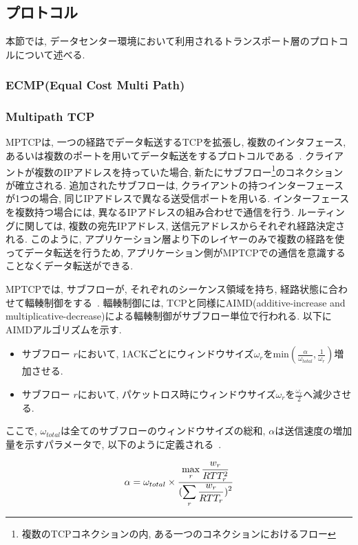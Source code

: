 \documentclass[11pt, a4paper, uplatex]{jsarticle}
\begin{document}
\subsection{プロトコル}
本節では, データセンター環境において利用されるトランスポート層のプロトコルについて述べる. 

\subsubsection{ECMP(Equal Cost Multi Path)}

\subsubsection{Multipath TCP}
MPTCPは, 一つの経路でデータ転送するTCPを拡張し, 複数のインタフェース,
あるいは複数のポートを用いてデータ転送をするプロトコルである~\cite{mptcp}.
クライアントが複数のIPアドレスを持っていた場合, 新たにサブフロー\footnote{複数のTCPコネクションの内,
ある一つのコネクションにおけるフロー}のコネクションが確立される.
追加されたサブフローは, クライアントの持つインターフェースが1つの場合, 同じIPアドレスで異なる送受信ポートを用いる.
インターフェースを複数持つ場合には, 異なるIPアドレスの組み合わせで通信を行う.
ルーティングに関しては, 複数の宛先IPアドレス, 送信元アドレスからそれぞれ経路決定される.
このように, アプリケーション層より下のレイヤーのみで複数の経路を使ってデータ転送を行うため,
アプリケーション側がMPTCPでの通信を意識することなくデータ転送ができる.

MPTCPでは, サブフローが, それぞれのシーケンス領域を持ち, 経路状態に合わせて輻輳制御をする~\cite{cong}.
輻輳制御には, TCPと同様にAIMD(additive-increase and
multiplicative-decrease)による輻輳制御がサブフロー単位で行われる.
以下にAIMDアルゴリズムを示す.

\begin{itemize}
\item サブフロー $r$において,
1ACKごとにウィンドウサイズ$\omega_{r}$をmin$(\frac{\alpha}{\omega_{total}},
\frac{1}{\omega_r})$増加させる.
\item サブフロー $r$において, パケットロス時にウィンドウサイズ$\omega_r$を$\frac{\omega_r}{2}$へ減少させる.
\end{itemize}
ここで, $\omega_{total}$は全てのサブフローのウィンドウサイズの総和, $\alpha$は送信速度の増加量を示すパラメータで,
以下のように定義される~\cite{cong}.

\vspace{-2mm}
\begin{eqnarray}
 \alpha = \omega_{total} \times
\frac{\displaystyle \max_{r} \frac{w_r}{RTT^2_r}}{\displaystyle
(\sum_{r}\frac{w_r}{RTT_r})^2}
\label{alpha}
\vspace{-2mm}
\end{eqnarray}
\end{document}
